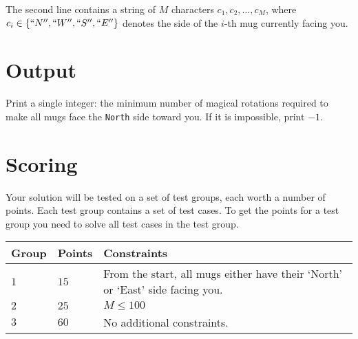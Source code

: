 The second line contains a string of $M$ characters $c_1, c_2, \dots, c_M$, where $c_i \in \{``N'',``W'',``S'',``E''\}$ denotes the side of the $i$-th mug currently facing you.

\section*{Output}
Print a single integer: the minimum number of magical rotations required to make all mugs face the \texttt{North} side toward you. If it is impossible, print \(-1\).

\section*{Scoring}
Your solution will be tested on a set of test groups, each worth a number of points. Each test group contains
a set of test cases. To get the points for a test group you need to solve all test cases in the test group.

\noindent
\begin{tabular}{| l | l | p{12cm} |}
  \hline
  \textbf{Group} & \textbf{Points} & \textbf{Constraints} \\ \hline
  $1$    & $15$       & From the start, all mugs either have their `North' or `East' side facing you. \\ \hline
  $2$    & $25$       & $M \leq 100$ \\ \hline
  $3$    & $60$       & No additional constraints. \\ \hline
\end{tabular}


